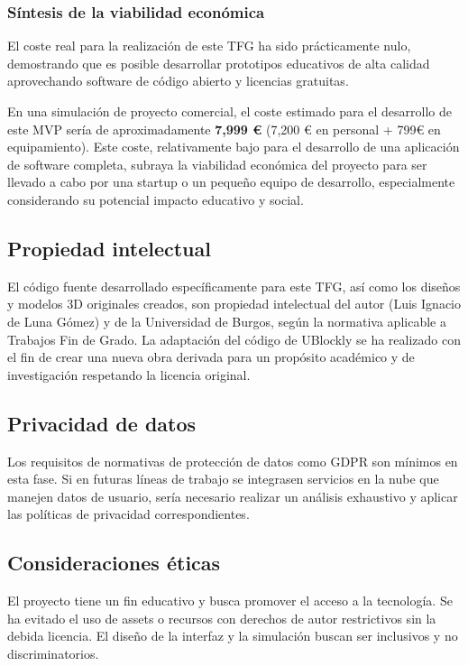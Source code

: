 \subsubsection{Síntesis de la viabilidad económica}
El coste real para la realización de este TFG ha sido prácticamente nulo, demostrando que es posible desarrollar prototipos educativos de alta calidad aprovechando software de código abierto y licencias gratuitas.

En una simulación de proyecto comercial, el coste estimado para el desarrollo de este MVP sería de aproximadamente \textbf{7,999 €} (7,200 € en personal + 799€ en equipamiento). Este coste, relativamente bajo para el desarrollo de una aplicación de software completa, subraya la viabilidad económica del proyecto para ser llevado a cabo por una startup o un pequeño equipo de desarrollo, especialmente considerando su potencial impacto educativo y social.

\subsection{Propiedad intelectual}
El código fuente desarrollado específicamente para este TFG, así como los diseños y modelos 3D originales creados, son propiedad intelectual del autor (Luis Ignacio de Luna Gómez) y de la Universidad de Burgos, según la normativa aplicable a Trabajos Fin de Grado. La adaptación del código de UBlockly se ha realizado con el fin de crear una nueva obra derivada para un propósito académico y de investigación respetando la licencia original.

\subsection{Privacidad de datos}
Los requisitos de normativas de protección de datos como GDPR son mínimos en esta fase. Si en futuras líneas de trabajo se integrasen servicios en la nube que manejen datos de usuario, sería necesario realizar un análisis exhaustivo y aplicar las políticas de privacidad correspondientes.

\subsection{Consideraciones éticas}
El proyecto tiene un fin educativo y busca promover el acceso a la tecnología. Se ha evitado el uso de assets o recursos con derechos de autor restrictivos sin la debida licencia. El diseño de la interfaz y la simulación buscan ser inclusivos y no discriminatorios.

